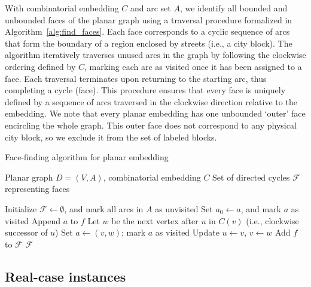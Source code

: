 With combinatorial embedding \( C \) and arc set \( A \), we identify all
bounded and unbounded faces of the planar graph using a traversal procedure
formalized in Algorithm~\ref{alg:find_faces}. Each face corresponds to a cyclic
sequence of arcs that form the boundary of a region enclosed by streets (i.e., a
city block). The algorithm iteratively traverses unused arcs in the graph by
following the clockwise ordering defined by \( C \), marking each arc as visited
once it has been assigned to a face. Each traversal terminates upon returning to
the starting arc, thus completing a cycle (face). This procedure ensures that
every face is uniquely defined by a sequence of arcs traversed in the clockwise
direction relative to the embedding. We note that every planar embedding has one
unbounded `outer' face encircling the whole graph. This outer face does not
correspond to any physical city block, so we exclude it from the set of labeled
blocks.


\begin{algorithm}[h!]
	\caption{Face-finding algorithm for planar embedding}
	\label{alg:find_faces}
	\begin{algorithmic}[1]
		\REQUIRE Planar graph \( D = (V, A) \), combinatorial embedding \( C \)
		\ENSURE Set of directed cycles \( \mathcal{F} \) representing faces

		\STATE Initialize \( \mathcal{F} \gets \emptyset \), and mark all arcs in \( A \) as unvisited
		\STATE Set \( a_0 \gets a \), and mark \( a \) as visited
		\REPEAT
		\STATE Append \( a \) to \( f \)
		\STATE Let \( w \) be the next vertex after \( u \) in \( C(v) \) (i.e., clockwise successor of \( u \))
		\STATE Set \( a \gets (v, w) \); mark \( a \) as visited
		\STATE Update \( u \gets v \), \( v \gets w \)
		\STATE Add \( f \) to \( \mathcal{F} \)
		\ENDFOR
		\RETURN \( \mathcal{F} \)
	\end{algorithmic}
\end{algorithm}

\subsection{Real-case instances}\label{subsec:real_instances}

